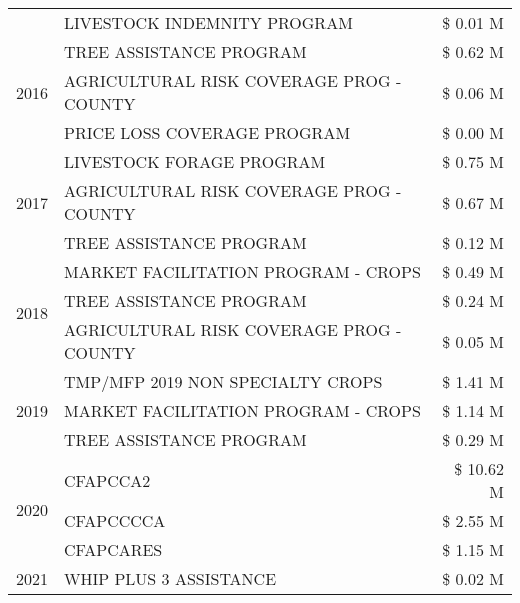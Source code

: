 \begin{tabular}{llr}
 & LIVESTOCK INDEMNITY PROGRAM & \$ 0.01 M \\
\cline{1-3}
\multirow[t]{3}{*}{2016} & TREE ASSISTANCE PROGRAM & \$ 0.62 M \\
 & AGRICULTURAL RISK COVERAGE PROG - COUNTY & \$ 0.06 M \\
 & PRICE LOSS COVERAGE PROGRAM & \$ 0.00 M \\
\cline{1-3}
\multirow[t]{3}{*}{2017} & LIVESTOCK FORAGE PROGRAM & \$ 0.75 M \\
 & AGRICULTURAL RISK COVERAGE PROG - COUNTY & \$ 0.67 M \\
 & TREE ASSISTANCE PROGRAM & \$ 0.12 M \\
\cline{1-3}
\multirow[t]{3}{*}{2018} & MARKET FACILITATION PROGRAM - CROPS & \$ 0.49 M \\
 & TREE ASSISTANCE PROGRAM & \$ 0.24 M \\
 & AGRICULTURAL RISK COVERAGE PROG - COUNTY & \$ 0.05 M \\
\cline{1-3}
\multirow[t]{3}{*}{2019} & TMP/MFP 2019 NON SPECIALTY CROPS & \$ 1.41 M \\
 & MARKET FACILITATION PROGRAM - CROPS & \$ 1.14 M \\
 & TREE ASSISTANCE PROGRAM & \$ 0.29 M \\
\cline{1-3}
\multirow[t]{3}{*}{2020} & CFAPCCA2 & \$ 10.62 M \\
 & CFAPCCCCA & \$ 2.55 M \\
 & CFAPCARES & \$ 1.15 M \\
\cline{1-3}
2021 & WHIP PLUS 3 ASSISTANCE & \$ 0.02 M \\
\cline{1-3}
\bottomrule
\end{tabular}
